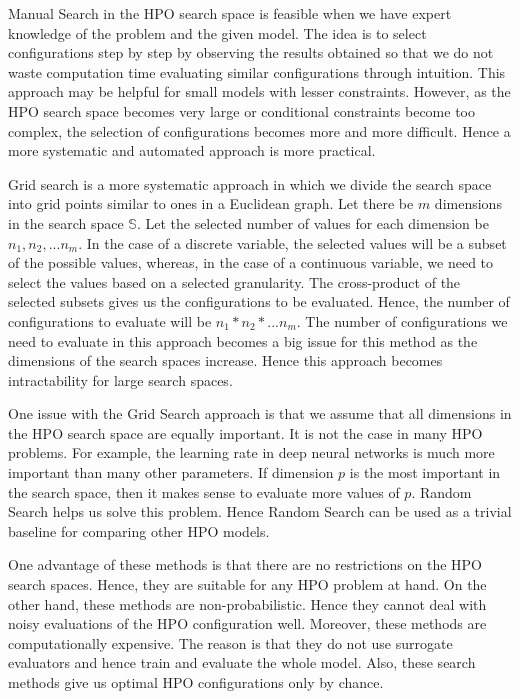 \documentclass[11pt]{article}
\begin{document}
Manual Search in the HPO search space is feasible when we have expert knowledge of the problem and the given model. 
The idea is to select configurations step by step by observing the results obtained
so that we do not waste computation time evaluating similar configurations through intuition.
This approach may be helpful for small models with lesser constraints.
However, as the HPO search space becomes very large or conditional constraints become too complex, the selection of configurations becomes more and more difficult.
Hence a more systematic and automated approach is more practical.

Grid search is a more systematic approach in which we divide the search space into grid points similar to ones in a Euclidean graph.
Let there be $m$ dimensions in the search space $\mathbb{S}$. Let the selected number of values for each dimension be $n_1, n_2, ... n_m$. In the case of a discrete variable, the selected values will be a subset of the possible values, whereas, in the case of a continuous variable, we need to select the values based on a selected granularity.
The cross-product of the selected subsets gives us the configurations to be evaluated. Hence, the number of configurations to evaluate will be $n_1 * n_2 * ... n_m$.
The number of configurations we need to evaluate in this approach becomes a big issue for this method as the dimensions of the search spaces increase.
Hence this approach becomes intractability for large search spaces.

One issue with the Grid Search approach is that we assume that all dimensions in the HPO search space are equally important. It is not the case in many HPO problems. For example, the learning rate in deep neural networks is much more important than many other parameters. If dimension $p$ is the most important in the search space, then it makes sense to evaluate more values of $p$. Random Search helps us solve this problem. Hence Random Search can be used as a trivial baseline for comparing other HPO models.

One advantage of these methods is that there are no restrictions on the HPO search spaces. Hence, they are suitable for any HPO problem at hand.
On the other hand, these methods are non-probabilistic.
Hence they cannot deal with noisy evaluations of the HPO configuration well.
Moreover, these methods are computationally expensive. The reason is that they do not use surrogate evaluators and hence train and evaluate the whole model.
Also, these search methods give us optimal HPO configurations only by chance.
\end{document}
